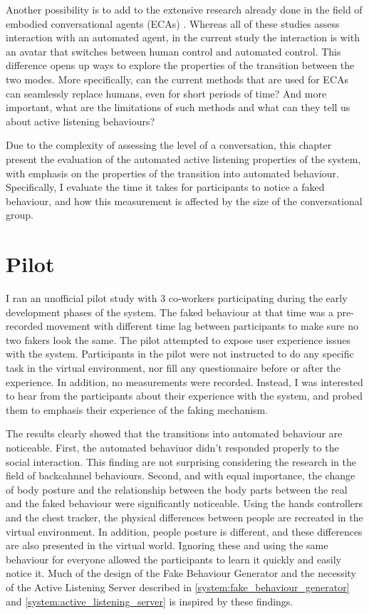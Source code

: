 \documentclass[]{simple-thesis}
\begin{document}
Another possibility is to add to the extensive research already done in the field of embodied conversational agents (ECAs) \citep{Nishimura2007, Bevacqua2008, Gratch2007, Huang2011, Lee2006}.
Whereas all of these studies assess interaction with an automated agent, in the current study the interaction is with an avatar that switches between human control and automated control.
This difference opens up ways to explore the properties of the transition between the two modes.
More specifically, can the current methods that are used for ECAs can seamlessly replace humans, even for short periods of time?
And more important, what are the limitations of such methods and what can they tell us about active listening behaviours?

Due to the complexity of assessing the level of a conversation, this chapter present the evaluation of the automated active listening properties of the system, with emphasis on the properties of the transition into automated behaviour.
Specifically, I evaluate the time it takes for participants to notice a faked behaviour, and how this measurement is affected by the size of the conversational group.

\section{Pilot}

I ran an unofficial pilot study with 3 co-workers participating during the early development phases of the system.
The faked behaviour at that time was a pre-recorded movement with different time lag between participants to make sure no two fakers look the same.
The pilot attempted to expose user experience issues with the system.
Participants in the pilot were not instructed to do any specific task in the virtual environment, nor fill any questionnaire before or after the experience.
In addition, no measurements were recorded.
Instead, I was interested to hear from the participants about their experience with the system, and probed them to emphasis their experience of the faking mechanism.

The results clearly showed that the transitions into automated behaviour are noticeable.
First, the automated behaviuor didn't responded properly to the social interaction.
This finding are not surprising considering the research in the field of backcahnnel behaviours.
Second, and with equal importance, the change of body posture and the relationship between the body parts between the real and the faked behaviour were significantly noticeable.
Using the hands controllers and the chest tracker, the physical differences between people are recreated in the virtual environment.
In addition, people posture is different, and these differences are also presented in the virtual world.
Ignoring these and using the same behaviour for everyone allowed the participants to learn it quickly and easily notice it.
Much of the design of the Fake Behaviour Generator and the necessity of the Active Listening Server described in \ref{system:fake_behaviour_generator} and \ref{system:active_listening_server} is inspired by these findings.
\end{document}
